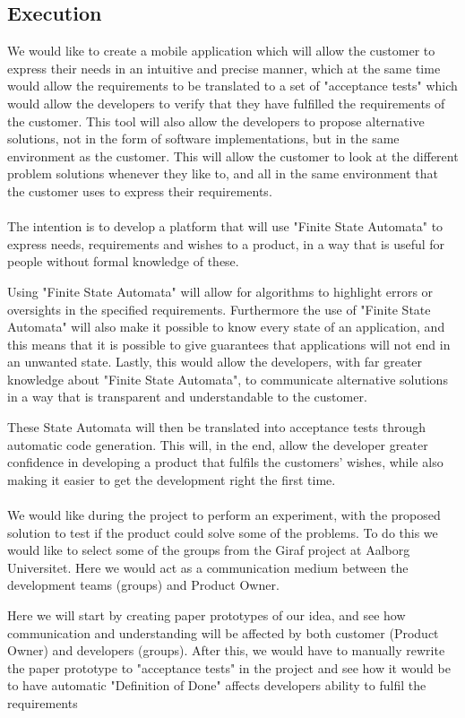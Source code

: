 \subsection{Execution}
We would like to create a mobile application which will allow the customer to express their needs in an intuitive and precise manner, which at the same time would allow the requirements to be translated to a set of "acceptance tests" which would allow the developers to verify that they have fulfilled the requirements of the customer.
This tool will also allow the developers to propose alternative solutions, not in the form of software implementations, but in the same environment as the customer. 
This will allow the customer to look at the different problem solutions whenever they like to, and all in the same environment that the customer uses to express their requirements. 
\\\\
The intention is to develop a platform that will use "Finite State Automata" to express needs, requirements and wishes to a product, in a way that is useful for people without formal knowledge of these. 

Using "Finite State Automata" will allow for algorithms to highlight errors or oversights in the specified requirements.
Furthermore the use of "Finite State Automata" will also make it possible to know every state of an application, and this means that it is possible to give guarantees that applications will not end in an unwanted state. 
Lastly, this would allow the developers, with far greater knowledge about "Finite State Automata", to communicate alternative solutions in a way that is transparent and understandable to the customer. 

These State Automata will then be translated into acceptance tests through automatic code generation.
This will, in the end, allow the developer greater confidence in developing a product that fulfils the customers' wishes, while also making it easier to get the development right the first time.
\\\\
We would like during the project to perform an experiment, with the proposed solution to test if the product could solve some of the problems.
To do this we would like to select some of the groups from the Giraf project at Aalborg Universitet. 
Here we would act as a communication medium between the development teams (groups) and Product Owner.

Here we will start by creating paper prototypes of our idea, and see how communication and understanding will be affected by both customer (Product Owner) and developers (groups).
After this, we would have to manually rewrite the paper prototype to "acceptance tests" in the project and see how it would be to have automatic "Definition of Done" affects developers ability to fulfil the requirements

